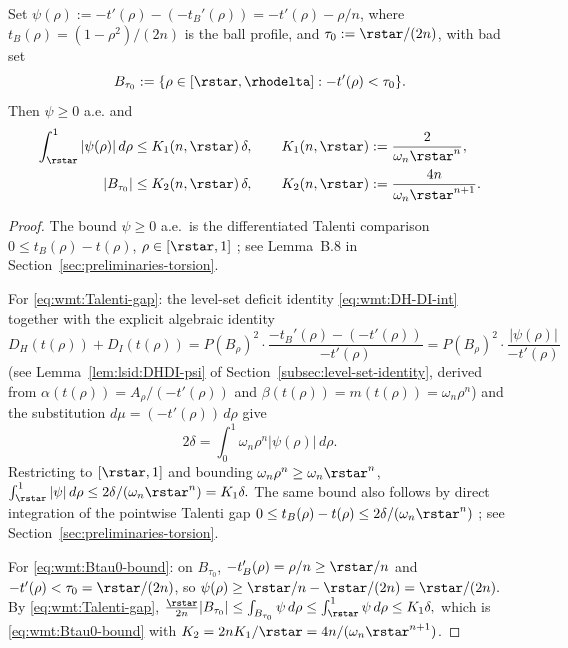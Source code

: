 \begin{lemma}
\label{lem:wmt:badtprime}
Set $\psi(\rho):=-t'(\rho)-(-t_B'(\rho))=-t'(\rho)-\rho/n$, where
$t_B(\rho)=(1-\rho^2)/(2n)$ is the ball profile, and
$\tau_0:=\rstar/(2n)$, with bad set
\begin{equation}\label{eq:wmt:def-Btau0}
   B_{\tau_0}:=\{\rho\in[\rstar,\rhodelta]:-t'(\rho)<\tau_0\}.
\end{equation}
Then $\psi\ge 0$ a.e. and
\begin{align}
   \int_{\rstar}^{1}|\psi(\rho)|\,d\rho
       &\le K_1(n,\rstar)\,\delta,
       \qquad K_1(n,\rstar):=\frac{2}{\omega_n\rstar^n},
       \label{eq:wmt:Talenti-gap}\\
   |B_{\tau_0}|
       &\le K_2(n,\rstar)\,\delta,
       \qquad K_2(n,\rstar):=\frac{4n}{\omega_n\rstar^{n+1}}.
       \label{eq:wmt:Btau0-bound}
\end{align}
\end{lemma}

\begin{proof}
The bound $\psi\ge 0$ a.e.\ is the differentiated Talenti comparison
$0\le t_B(\rho)-t(\rho)$, $\rho\in[\rstar,1]$
\cite[§3]{Talenti1976}; see Lemma~B.8 in
Section~\ref{sec:preliminaries-torsion}.

For \eqref{eq:wmt:Talenti-gap}: the level-set deficit identity
\eqref{eq:wmt:DH-DI-int} together with the explicit algebraic identity
\[
   D_H(t(\rho))+D_I(t(\rho))
   = P(B_\rho)^2\cdot\frac{-t_B'(\rho)-(-t'(\rho))}{-t'(\rho)}
   = P(B_\rho)^2\cdot\frac{|\psi(\rho)|}{-t'(\rho)}
\]
(see Lemma~\ref{lem:lsid:DHDI-psi} of
Section~\ref{subsec:level-set-identity}, derived from
$\alpha(t(\rho))=A_\rho/(-t'(\rho))$ and
$\beta(t(\rho))=m(t(\rho))=\omega_n\rho^n$) and the substitution
$d\mu=(-t'(\rho))\,d\rho$ give
\[
   2\delta=\int_0^1\omega_n\rho^n|\psi(\rho)|\,d\rho.
\]
Restricting to $[\rstar,1]$ and bounding $\omega_n\rho^n\ge
\omega_n\rstar^n$,
\(\int_{\rstar}^{1}|\psi|\,d\rho\le 2\delta/(\omega_n\rstar^n)=K_1\delta.\)
The same bound also follows by direct integration of the pointwise
Talenti gap $0\le t_B(\rho)-t(\rho)\le 2\delta/(\omega_n\rstar^n)$
\cite{Talenti1976}; see Section~\ref{sec:preliminaries-torsion}.

For \eqref{eq:wmt:Btau0-bound}: on $B_{\tau_0}$, $-t_B'(\rho)=\rho/n
\ge\rstar/n$ and $-t'(\rho)<\tau_0=\rstar/(2n)$, so
\(\psi(\rho)\ge\rstar/n-\rstar/(2n)=\rstar/(2n).\)
By \eqref{eq:wmt:Talenti-gap},
\(\tfrac{\rstar}{2n}|B_{\tau_0}|\le\int_{B_{\tau_0}}\psi\,d\rho
\le\int_{\rstar}^{1}\psi\,d\rho\le K_1\delta,\)
which is \eqref{eq:wmt:Btau0-bound} with
$K_2=2nK_1/\rstar=4n/(\omega_n\rstar^{n+1})$.
\end{proof}

